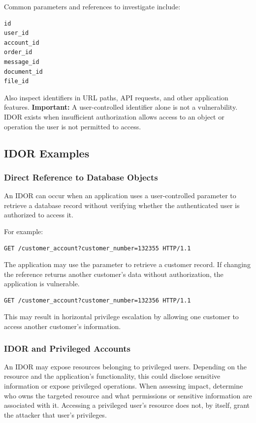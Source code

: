 \documentclass[11pt,a4paper]{article}
\begin{document}
Common parameters and references to investigate include:
\begin{lstlisting}
id
user_id
account_id
order_id
message_id
document_id
file_id
\end{lstlisting}

Also inspect identifiers in URL paths, API requests, and other application features.
\textbf{Important:} A user-controlled identifier alone is not a vulnerability. IDOR exists when insufficient authorization allows access to an object or operation the user is not permitted to access.

\subsection{IDOR Examples}

\subsubsection{Direct Reference to Database Objects}

An IDOR can occur when an application uses a user-controlled parameter to retrieve a database record without verifying whether the authenticated user is authorized to access it.

For example:
\begin{lstlisting}[language=HTTP]
GET /customer_account?customer_number=132355 HTTP/1.1
\end{lstlisting}

The application may use the parameter to retrieve a customer record. If changing the reference returns another customer's data without authorization, the application is vulnerable.

\begin{lstlisting}[language=HTTP]
GET /customer_account?customer_number=132356 HTTP/1.1
\end{lstlisting}

This may result in horizontal privilege escalation by allowing one customer to access another customer's information.

\subsubsection{IDOR and Privileged Accounts}

An IDOR may expose resources belonging to privileged users. Depending on the resource and the application's functionality, this could disclose sensitive information or expose privileged operations.
When assessing impact, determine who owns the targeted resource and what permissions or sensitive information are associated with it. Accessing a privileged user's resource does not, by itself, grant the attacker that user's privileges.
\end{document}
